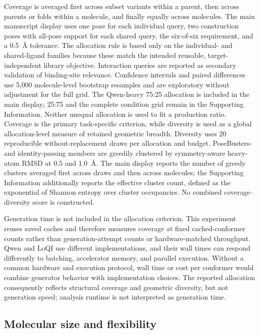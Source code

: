 Coverage is averaged first across subset variants within a parent, then across
parents or folds within a molecule, and finally equally across molecules. The
main manuscript display uses one pose for each individual query, two construction
poses with all-pose support for each shared query, the six-of-six requirement,
and a 0.5~\AA{} tolerance. The allocation rule is based only on the individual-
and shared-ligand families because these match the intended reusable, target-independent
library objective. Interaction queries are reported as secondary validation of
binding-site relevance. Confidence intervals and paired differences use 5,000 molecule-level
bootstrap resamples and are exploratory without adjustment for the full grid.
The Qwen-heavy 75:25 allocation is included in the main display; 25:75 and the
complete condition grid remain in the Supporting Information. Neither unequal
allocation is used to fit a production ratio. Coverage is the primary
task-specific criterion, while diversity is used as a global allocation-level measure
of retained geometric breadth. Diversity uses 20 reproducible
without-replacement draws per allocation and budget. PoseBusters- and identity-passing
members are greedily clustered by symmetry-aware heavy-atom RMSD at 0.5 and
1.0~\AA{}. The main display reports the number of greedy clusters averaged first
across draws and then across molecules;
the Supporting Information additionally reports the effective cluster count, defined
as the exponential of Shannon entropy over cluster occupancies. No combined
coverage--diversity score is constructed.

Generation time is not included in the allocation criterion. This experiment reuses
saved caches and therefore measures coverage at fixed cached-conformer counts rather
than generation-attempt counts or hardware-matched throughput. Qwen and LoQI use different implementations,
and their wall times can respond differently to batching, accelerator memory, and
parallel execution. Without a common hardware and execution protocol, wall time or
cost per conformer would combine generator behavior with implementation choices.
The reported allocation consequently reflects structural coverage and geometric
diversity, but not generation speed; analysis runtime is not interpreted as
generation time.

\subsection*{Molecular size and flexibility}

